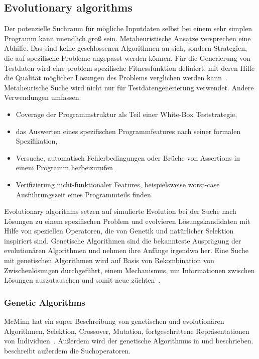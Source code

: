 \documentclass{article}
\begin{document}
\subsection{Evolutionary algorithms}
Der potenzielle Suchraum für mögliche Inputdaten selbst bei einem sehr simplen Programm kann unendlich groß sein. Metaheuristische Ansätze versprechen eine Abhilfe. Das sind keine geschlossenen Algorithmen an sich, sondern Strategien, die auf spezifische Probleme angepasst werden können. Für die Generierung von Testdaten wird eine problem-spezifische Fitnessfunktion definiert, mit deren Hilfe die Qualität möglicher Lösungen des Problems verglichen werden kann~\cite{McMinn_2004}. Metaheurische Suche wird nicht nur für Testdatengenerierung verwendet. Andere Verwendungen umfassen:
\begin{itemize}
	\item Coverage der Programmstruktur als Teil einer White-Box Teststrategie,
	\item das Auswerten eines spezifischen Programmfeatures nach seiner formalen Spezifikation,
	\item Versuche, automatisch Fehlerbedingungen oder Brüche von Assertions in einem Programm herbeizurufen
	\item Verifizierung nicht-funktionaler Features, beispielsweise worst-case Ausführungszeit eines Programmteils finden.
\end{itemize}
Evolutionary algorithms setzen auf simulierte Evolution bei der Suche nach Lösungen zu einem spezifischen Problem und evolvieren Lösungskandidaten mit Hilfe von speziellen Operatoren, die von Genetik und natürlicher Selektion inspiriert sind. Genetische Algorithmen sind die bekannteste Ausprägung der evolutionären Algorithmen und nehmen ihre Anfänge irgendwo her.  Eine Suche mit genetischen Algorithmen wird auf Basis von Rekombination von Zwischenlösungen durchgeführt, einem Mechanismus, um Informationen zwischen Lösungen auszutauschen und somit neue züchten~\cite{McMinn_2004}.

\subsubsection{Genetic Algorithms}
McMinn hat ein super Beschreibung von genetischen und evolutionären Algorithmen, Selektion, Crossover, Mutation, fortgeschrittene Repräsentationen von Individuen~\cite{McMinn_2004}. Außerdem wird der genetische Algorithmus in \cite{Fraser2011} und \cite{Fraser_2013} beschrieben. \cite{Fraser_2013} beschreibt außerdem die Suchoperatoren. 
\end{document}
